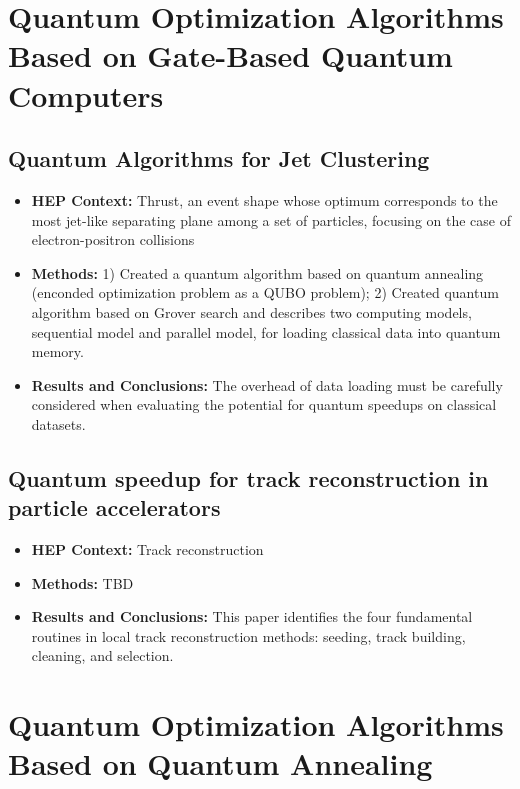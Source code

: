 \section{Quantum Optimization Algorithms Based on Gate-Based Quantum Computers}

\subsection{Quantum Algorithms for Jet Clustering~\cite{Wei:2019rqy}}
\begin{itemize}
	\item \textbf{HEP Context: }Thrust, an event shape whose optimum corresponds to the most jet-like separating plane among a set of particles, focusing on the case of electron-positron collisions
	\item \textbf{Methods: }1) Created a quantum algorithm based on quantum annealing (enconded optimization problem as a QUBO problem); 2) Created quantum algorithm based on Grover search and describes two computing models, sequential model and parallel model, for loading classical data into quantum memory.
	\item \textbf{Results and Conclusions: }The overhead of data loading must be carefully considered when evaluating the potential for quantum speedups on classical datasets.
\end{itemize}\subsection{Quantum speedup for track reconstruction in particle accelerators~\cite{Magano:2021jzd}}
\begin{itemize}
	\item \textbf{HEP Context: }Track reconstruction
	\item \textbf{Methods: }TBD
	\item \textbf{Results and Conclusions: }This paper identifies the four fundamental routines in local track reconstruction methods: seeding, track building, cleaning, and selection. 
\end{itemize}

\section{Quantum Optimization Algorithms Based on Quantum Annealing}

